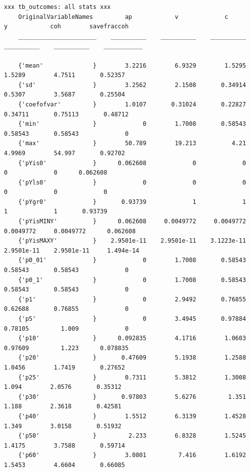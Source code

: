 \documentclass[
]{book}
\begin{document}
\begin{verbatim}
xxx tb_outcomes: all stats xxx
    OriginalVariableNames         ap            v             c             y            coh        savefraccoh
    ______________________    __________    __________    __________    __________    __________    ___________

    {'mean'              }        3.2216        6.9329        1.5295        1.5289        4.7511       0.52357 
    {'sd'                }        3.2562        2.1508       0.34914        0.5307        3.5687       0.25504 
    {'coefofvar'         }        1.0107       0.31024       0.22827       0.34711       0.75113       0.48712 
    {'min'               }             0        1.7008       0.58543       0.58543       0.58543             0 
    {'max'               }        50.789        19.213          4.21        4.9969        54.997       0.92702 
    {'pYis0'             }      0.062608             0             0             0             0      0.062608 
    {'pYls0'             }             0             0             0             0             0             0 
    {'pYgr0'             }       0.93739             1             1             1             1       0.93739 
    {'pYisMINY'          }      0.062608     0.0049772     0.0049772     0.0049772     0.0049772      0.062608 
    {'pYisMAXY'          }    2.9501e-11    2.9501e-11    3.1223e-11    2.9501e-11    2.9501e-11     1.494e-14 
    {'p0_01'             }             0        1.7008       0.58543       0.58543       0.58543             0 
    {'p0_1'              }             0        1.7008       0.58543       0.58543       0.58543             0 
    {'p1'                }             0        2.9492       0.76855       0.62688       0.76855             0 
    {'p5'                }             0        3.4945       0.97884       0.78105         1.009             0 
    {'p10'               }      0.092835        4.1716        1.0603       0.97609         1.223      0.078835 
    {'p20'               }       0.47609        5.1938        1.2588        1.0456        1.7419       0.27652 
    {'p25'               }        0.7311        5.3812        1.3008         1.094        2.0576       0.35312 
    {'p30'               }       0.97803        5.6276         1.351         1.188        2.3618       0.42581 
    {'p40'               }        1.5512        6.3139        1.4528         1.349        3.0158       0.51932 
    {'p50'               }         2.233        6.8328        1.5245        1.4175        3.7588       0.59714 
    {'p60'               }        3.0801         7.416        1.6192        1.5453        4.6604       0.66085 

\end{verbatim}
\end{document}

